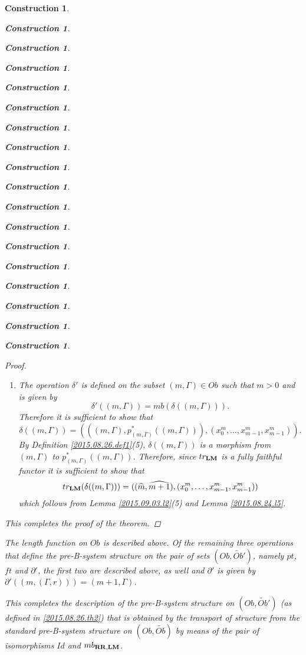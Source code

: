 \documentclass[onecolumn,12pt]{amsart}
\numberwithin{proposition}{subsection}
\newtheorem{construction}[proposition]{Construction}
\newcommand{\wt}{\widetilde}
\newcommand{\wh}{\widehat}
\newcommand{\RR}{{\bf RR}}
\newcommand{\LM}{{\bf LM}}
\begin{document}
\begin{construction}
\begin{construction}
\begin{construction}
\begin{construction}
\begin{construction}
\begin{construction}
\begin{construction}
\begin{construction}
\begin{construction}
\begin{construction}
\begin{construction}
\begin{construction}
\begin{construction}
\begin{construction}
\begin{construction}
\begin{construction}
\begin{construction}
\begin{construction}
\begin{proof}
\begin{enumerate}
\begin{equation*}
\begin{split}
    \wt{S}'((m,&(\Gamma,r)),(n,(\Gamma',s)))\\&=mb((mb^!(m,(\Gamma,r)))^*(mb^!((n,(\Gamma',s)))))]=mb(rr^*ss)\\&=
    mb((x_0^{n-1},\dots,x^{n-1}_{n-2},(qq^{n-m-1}(rr))(s)))\\&=(n-1,(rr^*((n+1,\Gamma')),(qq^{n-m-1}(rr))(s)))\\&=
    (n-1,(S'((m,(\Gamma,r)),(n+1,\Gamma'))),\theta_{m,n}(r,s)),
  \end{split}
\end{equation*}
where the third equality is by Lemma \ref{2015.09.03.l1} and the fifth by
(\ref{2016.01.21.eq2}) and the definition of $\theta_{m,n}(r,s)$.
%
\item The operation $\delta'$ is defined on the subset $(m,\Gamma)\in Ob$ such that $m>0$ and is given by
%
\[\delta'((m,\Gamma))=mb(\delta((m,\Gamma))).\]
%
Therefore it is sufficient to show that
%
\[\delta((m,\Gamma))=(((m,\Gamma),p_{(m,\Gamma)}^*((m,\Gamma))),(x_0^m,\dots,x_{m-1}^m,x_{m-1}^m)).\]
%
By Definition \ref{2015.08.26.def1}(5), $\delta((m,\Gamma))$ is a morphism from
$(m,\Gamma)$ to $p_{(m,\Gamma)}^*((m,\Gamma))$. Therefore, since $tr_{\LM}$ is
a fully faithful functor it is sufficient to show that
%
\[tr_{\LM}(\delta((m,\Gamma)))=((\wh{m},\wh{m+1}),(x_0^m,\dots,x_{m-1}^m,x_{m-1}^m))\]
%
which follows from Lemma \ref{2015.09.03.l2}(5) and Lemma \ref{2015.08.24.l5}.
%
\end{enumerate}
%
This completes the proof of the theorem. 
\end{proof}
%
The length function on $Ob$ is described above. Of the remaining three
operations that define the pre-B-system structure on the pair of sets
$(Ob,\wt{Ob}')$, namely $pt$, $ft$ and $\partial'$, the first two are described above,
as well and $\partial'$ is given by $\partial'((m,(\Gamma,r)))=(m+1,\Gamma)$.

This completes the description of the pre-B-system structure on $(Ob,\wt{Ob}')$
(as defined in \ref{2015.08.26.th2})
that is obtained by the transport of structure from the standard pre-B-system
structure on $(Ob,\wt{Ob})$ by means of the pair of isomorphisms $Id$ and
$mb_{\RR,\LM}$.


\end{construction}
\end{construction}
\end{construction}
\end{construction}
\end{construction}
\end{construction}
\end{construction}
\end{construction}
\end{construction}
\end{construction}
\end{construction}
\end{construction}
\end{construction}
\end{construction}
\end{construction}
\end{construction}
\end{construction}
\end{construction}
\end{document}
